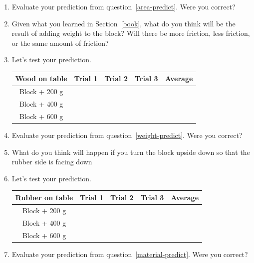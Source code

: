 \documentclass[10pt]{exam}
\begin{document}
\begin{enumerate}
  \item 
    Evaluate your prediction from question~\ref{area-predict}.  Were you correct?
    \vs 
    
    
\pagebreak
  \item \label{weight-predict}
    Given what you learned in Section~\ref{book}, what do you think will be the result of adding weight to the block? Will there be more friction, less friction, or the same amount of friction?
    \vs 
  
  \item 
    Let's test your prediction.  

    \begin{tabular}{|c
      *3{|>{\centering\arraybackslash}m{.1\textwidth}}
      ||>{\centering\arraybackslash}m{.1\textwidth}|}
      \hline
        \bf Wood on table & Trial 1 &
                            Trial 2 & 
                            Trial 3 &  Average \\\hline
        Block + 200 g &&&& \\[1.5em]\hline
        Block + 400 g &&&& \\[1.5em]\hline
        Block + 600 g &&&& \\[1.5em]\hline
    \end{tabular}

  \item 
    Evaluate your prediction from question~\ref{weight-predict}.  Were you correct?
    \vs 



  \item \label{material-predict}
    What do you think will happen if you turn the block upside down so that the rubber side is facing down
    \vs 
  
  \item 
    Let's test your prediction.  

    \begin{tabular}{|c
      *3{|>{\centering\arraybackslash}m{.1\textwidth}}
      ||>{\centering\arraybackslash}m{.1\textwidth}|}
      \hline
        \bf Rubber on table & Trial 1 &
                              Trial 2 & 
                              Trial 3 &  Average \\\hline
        Block + 200 g &&&& \\[1.5em]\hline
        Block + 400 g &&&& \\[1.5em]\hline
        Block + 600 g &&&& \\[1.5em]\hline
    \end{tabular}

  \item 
    Evaluate your prediction from question~\ref{material-predict}.  Were you correct?
    \vs 


\end{enumerate}
\end{document}
